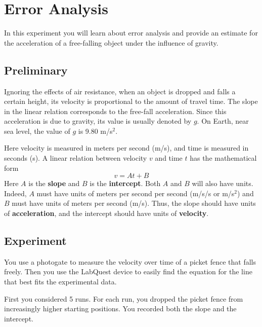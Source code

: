 \chapter{Error Analysis}
In this experiment you will learn about error analysis and provide an estimate for the acceleration of a free-falling object under the influence of gravity.
\section{Preliminary}
Ignoring the effects of air resistance, when an object is dropped and falls a certain height, its velocity is proportional to the amount of travel time. The slope in the linear relation corresponds to the free-fall acceleration. Since this acceleration is due to gravity, its value is usually denoted by $g$. On Earth, near sea level, the value of $g$ is 9.80 m/s$^{2}$.

Here velocity is measured in meters per second (m/s), and time is measured in seconds (s). A linear relation between velocity $v$ and time $t$ has the mathematical form
\begin{equation}
    v = A t + B
\end{equation}
Here $A$ is the \textbf{slope} and $B$ is the \textbf{intercept}. Both $A$ and $B$ will also have units. Indeed, $A$ must have units of meters per second per second (m/s/s or m/s$^{2}$) and $B$ must have units of meters per second (m/s). Thus, the slope should have units of \textbf{acceleration}, and the intercept should have units of \textbf{velocity}.
\section{Experiment}
You use a photogate to measure the velocity over time of a picket fence that falls freely. Then you use the LabQuest device to easily find the equation for the line that best fits the experimental data.

First you considered 5 runs. For each run, you dropped the picket fence from increasingly higher starting positions. You recorded both the slope and the intercept.

